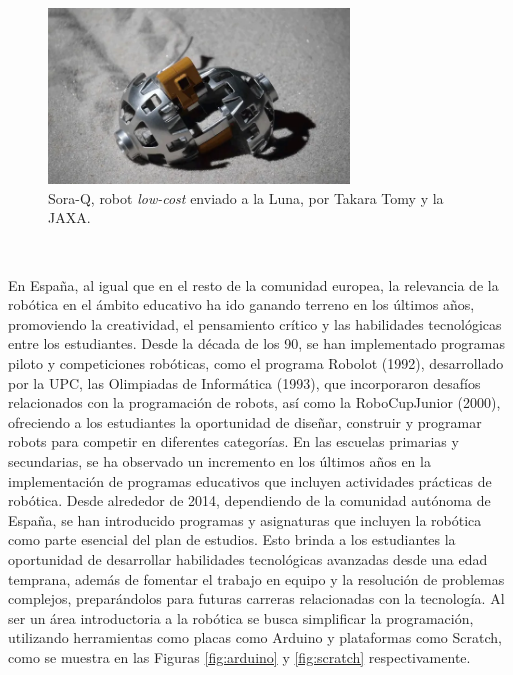 \begin{figure} [h!]
  \begin{center}
    \includegraphics[width=8cm]{figs/SoraQ_lunar_robot_JAXA}
  \end{center}
  \caption{Sora-Q, robot \textit{low-cost} enviado a la Luna, por Takara Tomy y la JAXA.}
  \label{fig:sora_q}
\end{figure}\

En España, al igual que en el resto de la comunidad europea, la relevancia de la
robótica en el ámbito educativo ha ido ganando terreno en los últimos años,
promoviendo la creatividad, el pensamiento crítico y las habilidades
tecnológicas entre los estudiantes. Desde la década de los 90, se han
implementado programas piloto y competiciones robóticas, como el programa
Robolot (1992), desarrollado por la UPC, las Olimpiadas de Informática (1993),
que incorporaron desafíos relacionados con la programación de robots, así como
la RoboCupJunior (2000), ofreciendo a los estudiantes la oportunidad de diseñar,
construir y programar robots para competir en diferentes categorías.
En las escuelas primarias y secundarias, se ha observado un incremento en los
últimos años en la implementación de programas educativos que incluyen
actividades prácticas de robótica.
Desde alrededor de 2014, dependiendo de la comunidad autónoma de España, se han
introducido programas y asignaturas que incluyen la robótica como parte esencial
del plan de estudios.
Esto brinda a los estudiantes la oportunidad de desarrollar habilidades
tecnológicas avanzadas desde una edad temprana, además de fomentar el trabajo en
equipo y la resolución de problemas complejos, preparándolos para futuras
carreras relacionadas con la tecnología.
Al ser un área introductoria a la robótica se busca simplificar la programación,
utilizando herramientas como placas como Arduino y plataformas como Scratch,
como se muestra en las Figuras \ref{fig:arduino} y \ref{fig:scratch}
respectivamente.

